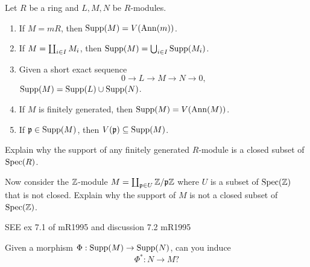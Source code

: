 \documentclass{ximera}
\begin{document}
\begin{proposition}%
  Let $R$ be a ring and $L,M,N$ be $R$-modules.
  \begin{enumerate}
  \item If $M = mR$, then $\operatorname{Supp}(M) = V(\operatorname{Ann}(m))$.
  \item If $M = \coprod_{i\in I} M_i$, then $\operatorname{Supp}(M) = \bigcup_{i\in I} \operatorname{Supp}(M_i)$.
  \item Given a short exact sequence
    \[
    0 \to L \to M \to N \to 0,
    \]
    $\operatorname{Supp}(M) = \operatorname{Supp}(L) \cup \operatorname{Supp}(N)$.
  \item If $M$ is finitely generated, then $\operatorname{Supp}(M) = V(\operatorname{Ann}(M))$.
  \item If $\mathfrak{p}\in\operatorname{Supp}(M)$, then $V(\mathfrak{p})\subseteq\operatorname{Supp}(M)$.
  \end{enumerate}
\end{proposition}

\begin{exercise}
  Explain why the support of any finitely generated $R$-module is a
  closed subset of $\operatorname{Spec}(R)$.

  Now consider the $\mathbb Z$-module $M = \coprod_{\mathfrak{p}\in U} \mathbb Z/\mathfrak{p}\mathbb Z$ where $U$
  is a subset of $\operatorname{Spec}(\mathbb Z)$ that is not closed. Explain why the
  support of $M$ is not a closed subset of $\operatorname{Spec}(\mathbb Z)$.
\end{exercise}




SEE ex 7.1 of mR1995 and discussion 7.2 mR1995




\begin{exercise}
  Given a morphism $\Phi:\operatorname{Supp}(M) \to \operatorname{Supp}(N)$, can you induce
  \[
  \Phi^* : N\to M?
  \]
\end{exercise}
\end{document}
